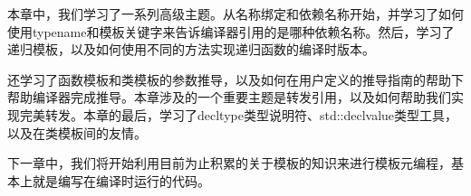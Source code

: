 本章中，我们学习了一系列高级主题。从名称绑定和依赖名称开始，并学习了如何使用typename和模板关键字来告诉编译器引用的是哪种依赖名称。然后，学习了递归模板，以及如何使用不同的方法实现递归函数的编译时版本。

还学习了函数模板和类模板的参数推导，以及如何在用户定义的推导指南的帮助下帮助编译器完成推导。本章涉及的一个重要主题是转发引用，以及如何帮助我们实现完美转发。本章的最后，学习了decltype类型说明符、std::declvalue类型工具，以及在类模板间的友情。

下一章中，我们将开始利用目前为止积累的关于模板的知识来进行模板元编程，基本上就是编写在编译时运行的代码。